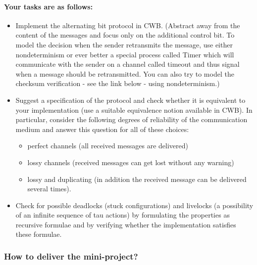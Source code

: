 \documentclass{article}
\begin{document}
\paragraph{Your tasks are as follows:}

\begin{itemize}
\item Implement the alternating bit protocol in CWB. (Abstract away
from the content of the messages and focus only on the additional
control bit. To model the decision when the sender retransmits the
message, use either nondeterminism or ever better a special process
called Timer which will communicate with the sender on a channel
called timeout and thus signal when a message should be
retransmitted. You can also try to model the checksum verification -
see the link below - using nondeterminism.)
\item Suggest a
specification of the protocol and check whether it is equivalent to
your implementation (use a suitable equivalence notion available in
CWB). In particular, consider the following degrees of reliability
of the communication medium and answer this question for all of
these choices:
\begin{itemize}
          \item perfect channels (all received messages are delivered)
          \item lossy channels (received messages can get lost without any warning)
          \item lossy and duplicating (in addition the received message can be delivered several times).
\end{itemize}
\item Check for possible deadlocks (stuck configurations) and
livelocks (a possibility of an infinite sequence of tau actions) by
formulating the properties as recursive formulae and by verifying
whether the implementation satisfies these formulae.
\end{itemize}

\subsubsection*{How to deliver the mini-project?}
\end{document}
